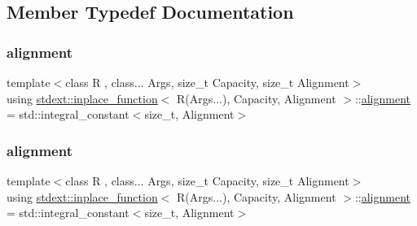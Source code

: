 \subsection{Member Typedef Documentation}
\mbox{\label{classstdext_1_1inplace__function_3_01R_07Args_8_8_8_08_00_01Capacity_00_01Alignment_01_4_a6fb11b21afeb300682fb544ff2f9c4db}} 
\subsubsection{\texorpdfstring{alignment}{alignment}\hspace{0.1cm}{\footnotesize\ttfamily [1/2]}}
{\footnotesize\ttfamily template$<$class R , class... Args, size\+\_\+t Capacity, size\+\_\+t Alignment$>$ \\
using \hyperlink{classstdext_1_1inplace__function}{stdext\+::inplace\+\_\+function}$<$ R(Args...), Capacity, Alignment $>$\+::\hyperlink{classstdext_1_1inplace__function_3_01R_07Args_8_8_8_08_00_01Capacity_00_01Alignment_01_4_a6fb11b21afeb300682fb544ff2f9c4db}{alignment} =  std\+::integral\+\_\+constant$<$size\+\_\+t, Alignment$>$}

\mbox{\label{classstdext_1_1inplace__function_3_01R_07Args_8_8_8_08_00_01Capacity_00_01Alignment_01_4_a6fb11b21afeb300682fb544ff2f9c4db}} 
\subsubsection{\texorpdfstring{alignment}{alignment}\hspace{0.1cm}{\footnotesize\ttfamily [2/2]}}
{\footnotesize\ttfamily template$<$class R , class... Args, size\+\_\+t Capacity, size\+\_\+t Alignment$>$ \\
using \hyperlink{classstdext_1_1inplace__function}{stdext\+::inplace\+\_\+function}$<$ R(Args...), Capacity, Alignment $>$\+::\hyperlink{classstdext_1_1inplace__function_3_01R_07Args_8_8_8_08_00_01Capacity_00_01Alignment_01_4_a6fb11b21afeb300682fb544ff2f9c4db}{alignment} =  std\+::integral\+\_\+constant$<$size\+\_\+t, Alignment$>$}

